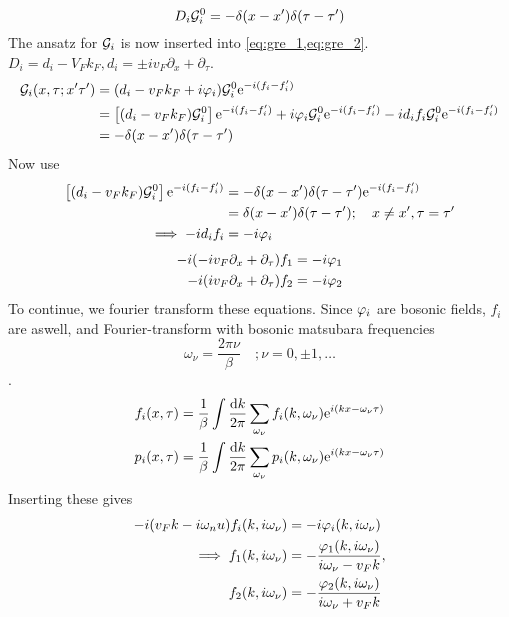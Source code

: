 \[D_i\mathcal{G}_i^0 = -\delta(x-x')\delta(\tau-\tau')\]
The ansatz for $\mathcal{G}_i$ is now inserted into \cref{eq:gre_1,eq:gre_2}.
$D_i = d_i - V_Fk_F, d_i = \pm iv_F\partial_x + \partial_\tau$.
\begin{align*}
\mathcal{G}_i(x,\tau;x'\tau') &=(d_i - v_Fk_F+i\varphi_i)\mathcal{G}_i^0\mathrm{e}^{-i(f_i-f_i')}\\ &=\left[(d_i-v_Fk_F)\mathcal{G}_i^0\right]\mathrm{e}^{-i(f_i-f_i')} + i\varphi_i\mathcal{G}_i^0\mathrm{e}^{-i(f_i-f_i')} -id_if_i\mathcal{G}_i^0\mathrm{e}^{-i(f_i-f_i')} \\
&= -\delta(x-x')\delta(\tau-\tau')
\end{align*}
Now use
\begin{align*}
\left[(d_i-v_Fk_F)\mathcal{G}_i^0\right]\mathrm{e}^{-i(f_i-f_i')} &= -\delta(x-x')\delta(\tau-\tau')\mathrm{e}^{-i(f_i-f_i')}\\&=\delta(x-x')\delta(\tau-\tau');\quad x\ne x',\tau=\tau' \\
\implies  -id_if_i &= -i\varphi_i
\end{align*}
\begin{align}
-i(-iv_F\partial_x+\partial_\tau)f_1 &= -i\varphi_1 \\
-i(iv_F\partial_x+\partial_\tau)f_2 &= -i\varphi_2
\end{align}
To continue, we fourier transform these equations. Since $\varphi_i$ are bosonic fields, $f_i$ are aswell, and Fourier-transform with bosonic matsubara frequencies \[\omega_\nu = \frac{2\pi\nu}{\beta}\quad;\nu = 0,\pm1,\dots\].
\begin{align*}
f_i(x,\tau) &= \frac{1}{\beta}\int\frac{\dd k}{2\pi}\sum_{\omega_\nu}f_i(k,\omega_\nu)\mathrm{e}^{i(kx-\omega_\nu\tau)}\\
p_i(x,\tau) &= \frac{1}{\beta}\int\frac{\dd k}{2\pi}\sum_{\omega_\nu}p_i(k,\omega_\nu)\mathrm{e}^{i(kx-\omega_\nu\tau)}
\end{align*}
Inserting these gives
\begin{align}
\nonumber
-i(v_Fk-i\omega_nu)f_i(k,i\omega_\nu) &= -i\varphi_i(k,i\omega_\nu) \\
\implies f_1(k,i\omega_\nu) 
&= -\frac{\varphi_1(k,i\omega_\nu)}{i\omega_\nu - v_Fk}, \\
f_2(k,i\omega_\nu) &= -\frac{\varphi_2(k,i\omega_\nu)}{i\omega_\nu + v_Fk}
\end{align}

